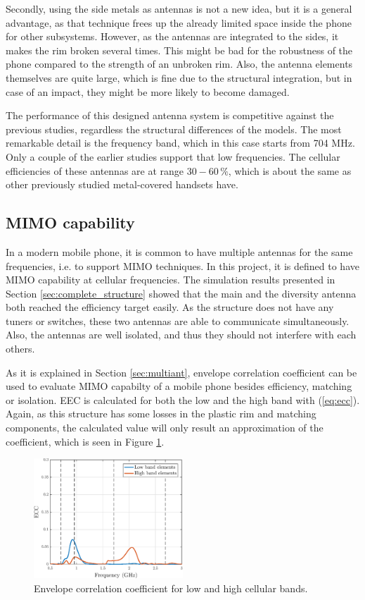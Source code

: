 Secondly, using the side metals as antennas is not a new idea, but it is a general advantage, as that technique frees up the already limited space inside the phone for other subsystems. However, as the antennas are integrated to the sides, it makes the rim broken several times. This might be bad for the robustness of the phone compared to the strength of an unbroken rim. Also, the antenna elements themselves are quite large, which is fine due to the structural integration, but in case of an impact, they might be more likely to become damaged.

The performance of this designed antenna system is competitive against the previous studies, regardless the structural differences of the models. The most remarkable detail is the frequency band, which in this case starts from 704 MHz. Only a couple of the earlier studies support that low frequencies. The cellular efficiencies of these antennas are at range $30-60\,\%$, which is about the same as other previously studied metal-covered handsets have. 


\subsection{MIMO capability}
\label{sec:mimo_cap}
In a modern mobile phone, it is common to have multiple antennas for the same frequencies, i.e. to support MIMO techniques. In this project, it is defined to have MIMO capability at cellular frequencies. The simulation results presented in Section \ref{sec:complete_structure} showed that the main and the diversity antenna both reached the efficiency target easily. As the structure does not have any tuners or switches, these two antennas are able to communicate simultaneously. Also, the antennas are well isolated, and thus they should not interfere with each others.

As it is explained in Section \ref{sec:multiant}, envelope correlation coefficient can be used to evaluate MIMO capabilty of a mobile phone besides efficiency, matching or isolation. EEC is calculated for both the low and the high band with (\ref{eq:ecc}). Again, as this structure has some losses in the plastic rim and matching components, the calculated value will only result an approximation of the coefficient, which is seen in Figure \ref{fig:ecc}. 
\begin{figure}[H]
    \centering
    \includegraphics[width=0.5\textwidth]{img/ecc.eps}
    \caption{Envelope correlation coefficient for low and high cellular bands.}
    \label{fig:ecc}
\end{figure}

